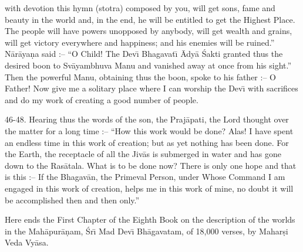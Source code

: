 with devotion this hymn (stotra) composed by you, will get sons, fame and beauty in the world and, in the end, he will be entitled to get the Highest Place. The people will have powers unopposed by anybody, will get wealth and grains, will get victory everywhere and happiness; and his enemies will be ruined.'' N\=ar\=aya\d{n}a said :-- ``O Child! The Dev\={\i} Bhagavat\={\i} \=Ady\=a \'Sakti granted thus the desired boon to Sv\=ayambhuva Manu and vanished away at once from his sight.'' Then the powerful Manu, obtaining thus the boon, spoke to his father :-- O Father! Now give me a solitary place where I can worship the Dev\={\i} with sacrifices and do my work of creating a good number of people.

46-48. Hearing thus the words of the son, the Praj\=apati, the Lord thought over the matter for a long time :-- ``How this work would be done? Alas! I have spent an endless time in this work of creation; but as yet nothing has been done. For the Earth, the receptacle of all the Jiv\=as is submerged in water and has gone down to the Ras\=atala. What is to be done now? There is only one hope and that is this :-- If the Bhagav\=an, the Primeval Person, under Whose Command I am engaged in this work of creation, helps me in this work of mine, no doubt it will be accomplished then and then only.''

Here ends the First Chapter of the Eighth Book on the description of the worlds in the Mah\=apur\=a\d{n}am, \'Sr\={\i} Mad Dev\={\i} Bh\=agavatam, of 18,000 verses, by Mahar\d{s}i Veda Vy\=asa.



